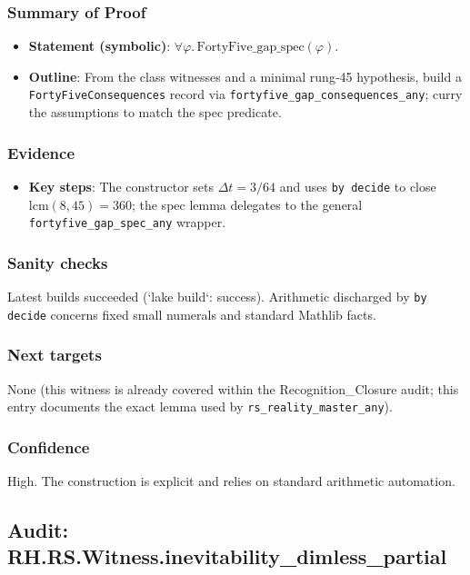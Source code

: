 \documentclass{article}
\begin{document}
\subsubsection{Summary of Proof}
\begin{itemize}[leftmargin=*]
  \item \textbf{Statement (symbolic)}: \(\forall φ.\,\mathrm{FortyFive\_gap\_spec}(φ)\).
  \item \textbf{Outline}: From the class witnesses and a minimal rung‑45 hypothesis, build a \texttt{FortyFiveConsequences} record via \texttt{fortyfive\_gap\_consequences\_any}; curry the assumptions to match the spec predicate.
\end{itemize}

\subsubsection{Evidence}
\begin{itemize}[leftmargin=*]
  \item \textbf{Key steps}: The constructor sets \(\Delta t=3/64\) and uses \texttt{by decide} to close \(\mathrm{lcm}(8,45)=360\); the spec lemma delegates to the general \texttt{fortyfive\_gap\_spec\_any} wrapper.
\end{itemize}

\subsubsection{Sanity checks}
Latest builds succeeded (`lake build`: success). Arithmetic discharged by \texttt{by decide} concerns fixed small numerals and standard Mathlib facts.

\subsubsection{Next targets}
None (this witness is already covered within the Recognition\_Closure audit; this entry documents the exact lemma used by \texttt{rs\_reality\_master\_any}).

\subsubsection{Confidence}
High. The construction is explicit and relies on standard arithmetic automation.

\subsection{Audit: RH.RS.Witness.inevitability\_dimless\_partial}
\end{document}
